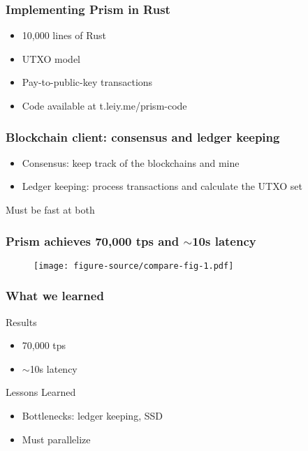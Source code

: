 \documentclass[aspectratio=169]{beamer}
\begin{document}
\begin{frame}
    \frametitle{Implementing Prism in Rust}
    \begin{itemize}
        \item 10,000 lines of Rust
        \item UTXO model
        \item Pay-to-public-key transactions
        \item Code available at t.leiy.me/prism-code
    \end{itemize}
\end{frame}

\begin{frame}
    \frametitle{Blockchain client: consensus and ledger keeping}
    \begin{itemize}
        \item \alert{Consensus}: keep track of the blockchains and mine
        \item \alert{Ledger keeping}: process transactions and calculate the UTXO set
    \end{itemize}
    \pause
    \alert{Must be fast at both}
\end{frame}

\begin{frame}
    \frametitle{Prism achieves 70,000 tps and $\sim$10s latency}
    \begin{figure}
        \centering
        \texttt{[image: figure-source/compare-fig-1.pdf]}
    \end{figure}
\end{frame}

\begin{frame}
    \frametitle{What we learned}
    \begin{block}{Results}
    \begin{itemize}
        \item 70,000 tps
        \item $\sim$10s latency
    \end{itemize}
    \end{block}
    \pause
    \begin{block}{Lessons Learned}
        \begin{itemize}
            \item Bottlenecks: ledger keeping, SSD
            \item Must parallelize
        \end{itemize}
    \end{block}
\end{frame}
\end{document}
